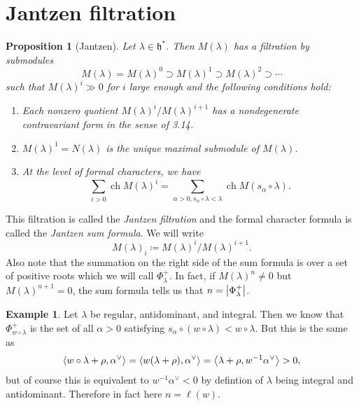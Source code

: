 \documentclass{amsart}
\newtheorem{prop}[thm]{Proposition}
\theoremstyle{definition}
\newtheorem{exm}[thm]{Example}
\theoremstyle{remark}
\theoremstyle{plain}
\theoremstyle{definition}
\theoremstyle{remark}
\newcommand{\h}{\mathfrak{h}}
\newcommand{\1}{\mathbf{1}}
\newcommand{\2}{\mathbf{2}}
\newcommand{\3}{\mathbf{3}}
\begin{document}
\section{Jantzen filtration}
\label{sec:jantzen_filtration}

\begin{prop}[Jantzen]
  Let $\lambda \in \h^{*}$. Then $M(\lambda)$ has a filtration by submodules
  \[ M(\lambda) = M(\lambda)^{0} \supset M(\lambda)^{1} \supset M(\lambda)^{2} \supset \cdots \]
  such that $M(\lambda)^{i} \gg 0$ for $i$ large enough and the following conditions hold:
  \begin{enumerate}
    \item Each nonzero quotient $M(\lambda)^{i} / M(\lambda)^{i+1}$ has a nondegenerate contravariant form in the sense of 3.14.
    \item $M(\lambda)^{1} = N(\lambda)$ is the unique maximal submodule of $M(\lambda)$.
    \item At the level of formal characters, we have
      \[ \sum_{i > 0} \operatorname{ch} M(\lambda)^{i} = \sum_{\alpha > 0, s_{\alpha} \circ \lambda < \lambda} \operatorname{ch} M(s_{\alpha} \circ \lambda). \]
  \end{enumerate}
\end{prop}

This filtration is called the \textit{Jantzen filtration} and the formal character formula is called the \textit{Jantzen sum formula}. We will write
\[ M(\lambda)_{i} \coloneqq M(\lambda)^{i} / M(\lambda)^{i+1}. \]
Also note that the summation on the right side of the sum formula is over a set of positive roots which we will call $\Phi_{\lambda}^+$. In fact, if $M(\lambda)^n \neq 0$ but $M(\lambda)^{n+1} = 0$, the sum formula tells us that $n = \abs{\Phi_{\lambda}^+}$.

\begin{exm}
  Let $\lambda$ be regular, antidominant, and integral. Then we know that $\Phi_{w \circ \lambda}^+$ is the set of all $\alpha > 0$ satisfying $s_{\alpha} \circ (w \circ \lambda) < w \circ \lambda$. But this is the same as
  \[ \ev{w \circ \lambda + \rho, \alpha^{\vee}} = \ev{w(\lambda + \rho), \alpha^{\vee}} = \ev{\lambda + \rho, w^{-1} \alpha^{\vee}} > 0, \]
  but of course this is equivalent to $w^{-1} \alpha^{\vee} < 0$ by defintion of $\lambda$ being integral and antidominant. Therefore in fact here $n = \ell(w)$.
\end{exm}
\end{document}
